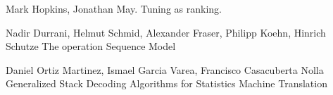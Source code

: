 \documentclass[11pt]{article}
\begin{document}
\begin{thebibliography}{1}

 Mark Hopkins, Jonathan May.
  \newblock Tuning as ranking.
 
  
 Nadir Durrani, Helmut Schmid, Alexander Fraser, Philipp Koehn, Hinrich Schutze
  \newblock The operation Sequence Model
  
  Daniel Ortiz Martinez, Ismael Garcia Varea, Francisco Casacuberta Nolla
  \newblock Generalized Stack Decoding Algorithms for Statistics Machine Translation

\end{thebibliography}
\end{document}
